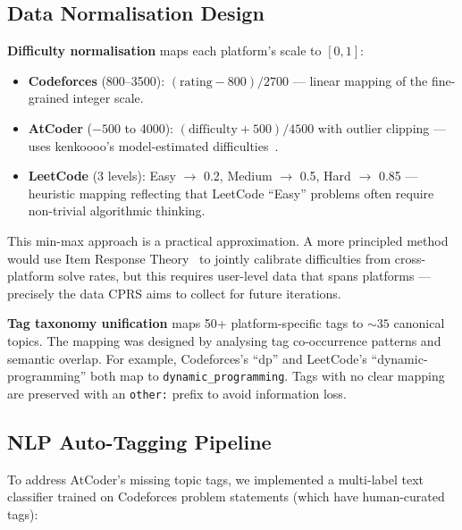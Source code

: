 \documentclass[12pt,a4paper]{article}
\begin{document}
\subsection{Data Normalisation Design}

\textbf{Difficulty normalisation} maps each platform's scale to $[0, 1]$:

\begin{itemize}
    \item \textbf{Codeforces} (800--3500): $(\text{rating} - 800) / 2700$ --- linear mapping of the fine-grained integer scale.
    \item \textbf{AtCoder} ($-500$ to 4000): $(\text{difficulty} + 500) / 4500$ with outlier clipping --- uses kenkoooo's model-estimated difficulties~\cite{kenkoooo2024}.
    \item \textbf{LeetCode} (3 levels): Easy $\to$ 0.2, Medium $\to$ 0.5, Hard $\to$ 0.85 --- heuristic mapping reflecting that LeetCode ``Easy'' problems often require non-trivial algorithmic thinking.
\end{itemize}

This min-max approach is a practical approximation. A more principled method would use Item Response Theory~\cite{baker2001} to jointly calibrate difficulties from cross-platform solve rates, but this requires user-level data that spans platforms --- precisely the data CPRS aims to collect for future iterations.

\textbf{Tag taxonomy unification} maps 50+ platform-specific tags to ${\sim}35$ canonical topics. The mapping was designed by analysing tag co-occurrence patterns and semantic overlap. For example, Codeforces's ``dp'' and LeetCode's ``dynamic-programming'' both map to \texttt{dynamic\_programming}. Tags with no clear mapping are preserved with an \texttt{other:} prefix to avoid information loss.

\subsection{NLP Auto-Tagging Pipeline}

To address AtCoder's missing topic tags, we implemented a multi-label text classifier trained on Codeforces problem statements (which have human-curated tags):
\end{document}
